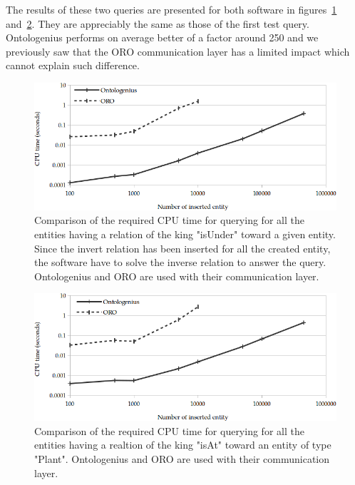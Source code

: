 The results of these two queries are presented for both software in figures~\ref{fig:chap2_oro_r3} and~\ref{fig:chap2_oro_r2}. They are appreciably the same as those of the first test query. Ontologenius performs on average better of a factor around 250 and we previously saw that the ORO communication layer has a limited impact which cannot explain such difference.

\begin{figure}[ht!]
\centering
\includegraphics[width=\textwidth]{figures/chapter2/oro/R3.png}
\caption{\label{fig:chap2_oro_r3} Comparison of the required CPU time for querying for all the entities having a relation of the king "isUnder" toward a given entity. Since the invert relation has been inserted for all the created entity, the software have to solve the inverse relation to answer the query. Ontologenius and ORO are used with their communication layer.}
\end{figure}

\begin{figure}[ht!]
\centering
\includegraphics[width=\textwidth]{figures/chapter2/oro/R2.png}
\caption{\label{fig:chap2_oro_r2} Comparison of the required CPU time for querying for all the entities having a realtion of the king "isAt" toward an entity of type "Plant". Ontologenius and ORO are used with their communication layer.}
\end{figure}

